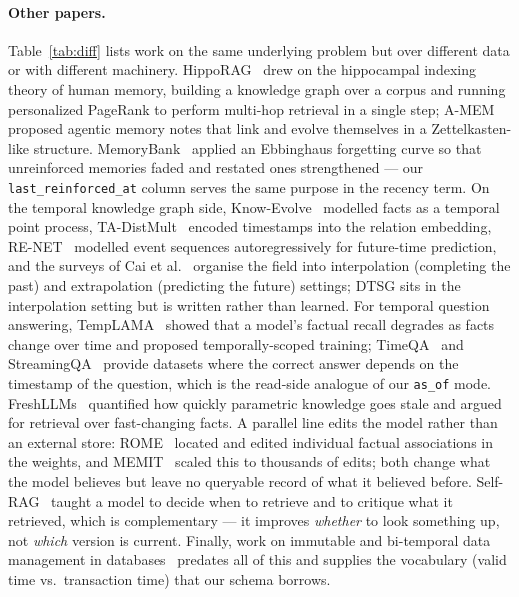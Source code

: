 \documentclass[11pt,a4paper]{article}
\begin{document}
\paragraph{Other papers.} Table~\ref{tab:diff} lists work on the same
underlying problem but over different data or with different machinery.
HippoRAG~\cite{gutierrez2024hipporag} drew on the hippocampal indexing theory
of human memory, building a knowledge graph over a corpus and running
personalized PageRank to perform multi-hop retrieval in a single step;
A-MEM~\cite{xu2025amem} proposed agentic memory notes that link and evolve
themselves in a Zettelkasten-like structure.
MemoryBank~\cite{zhong2023memorybank} applied an Ebbinghaus forgetting curve so
that unreinforced memories faded and restated ones strengthened --- our
\texttt{last\_reinforced\_at} column serves the same purpose in the recency
term. On the temporal knowledge graph side,
Know-Evolve~\cite{trivedi2017knowevolve} modelled facts as a temporal point
process, TA-DistMult~\cite{garciaduran2018learning} encoded timestamps into the
relation embedding, RE-NET~\cite{jin2020renet} modelled event sequences
autoregressively for future-time prediction, and the surveys of Cai et
al.~\cite{cai2023tkgsurvey} organise the field into interpolation (completing
the past) and extrapolation (predicting the future) settings; DTSG sits in the
interpolation setting but is written rather than learned. For temporal question
answering, TempLAMA~\cite{dhingra2022templama} showed that a model's factual
recall degrades as facts change over time and proposed temporally-scoped
training; TimeQA~\cite{chen2021timeqa} and StreamingQA~\cite{liska2022streamingqa}
provide datasets where the correct answer depends on the timestamp of the
question, which is the read-side analogue of our \texttt{as\_of} mode.
FreshLLMs~\cite{vu2023freshllms} quantified how quickly parametric knowledge
goes stale and argued for retrieval over fast-changing facts. A parallel line
edits the model rather than an external store: ROME~\cite{meng2022rome} located
and edited individual factual associations in the weights, and
MEMIT~\cite{meng2023memit} scaled this to thousands of edits; both change what
the model believes but leave no queryable record of what it believed before.
Self-RAG~\cite{asai2024selfrag} taught a model to decide when to retrieve and
to critique what it retrieved, which is complementary --- it improves
\emph{whether} to look something up, not \emph{which} version is current.
Finally, work on immutable and bi-temporal data management in
databases~\cite{snodgrass1999developing} predates all of this and supplies the
vocabulary (valid time vs.\ transaction time) that our schema borrows.
\end{document}
